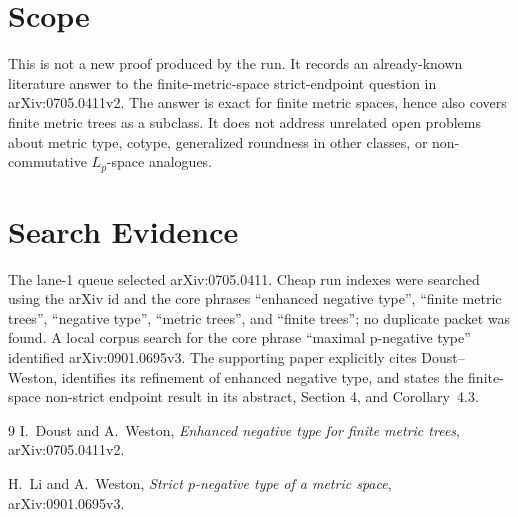 \documentclass[11pt]{article}
\begin{document}
\section*{Scope}

This is not a new proof produced by the run. It records an already-known
literature answer to the finite-metric-space strict-endpoint question in
arXiv:0705.0411v2. The answer is exact for finite metric spaces, hence also
covers finite metric trees as a subclass. It does not address unrelated open
problems about metric type, cotype, generalized roundness in other classes,
or non-commutative \(L_p\)-space analogues.

\section*{Search Evidence}

The lane-1 queue selected arXiv:0705.0411. Cheap run indexes were searched
using the arXiv id and the core phrases ``enhanced negative type'', ``finite
metric trees'', ``negative type'', ``metric trees'', and ``finite trees''; no
duplicate packet was found. A local corpus search for the core phrase
``maximal p-negative type'' identified arXiv:0901.0695v3. The supporting paper
explicitly cites Doust--Weston, identifies its refinement of enhanced negative
type, and states the finite-space non-strict endpoint result in its abstract,
Section 4, and Corollary~4.3.

\begin{thebibliography}{9}
I.~Doust and A.~Weston,
\emph{Enhanced negative type for finite metric trees},
arXiv:0705.0411v2.

H.~Li and A.~Weston,
\emph{Strict \(p\)-negative type of a metric space},
arXiv:0901.0695v3.
\end{thebibliography}
\end{document}
